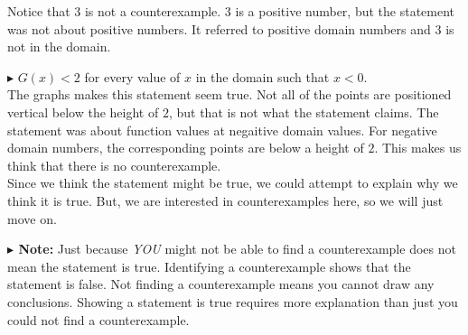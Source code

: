 \documentclass{ximera}
\begin{document}
Notice that $3$ is not a counterexample.  $3$ is a positive number, but the statement was not about positive numbers.  It referred to positive domain numbers and $3$ is not in the domain.














\textbf{\textcolor{red!90!darkgray}{$\blacktriangleright$}} $G(x) < 2$  for every value of $x$ in the domain such that $x < 0$. \\

The graphs makes this statement seem true.  Not all of the points are positioned vertical below the height of $2$, but that is not what the statement claims. The statement was about function values at negaitive domain values. For negative domain numbers, the corresponding points are below a height of $2$.  This makes us think that there is no counterexample.  \\

Since we think the statement might be true, we could attempt to explain why we think it is true.  But, we are interested in counterexamples here, so we will just move on.








\textbf{$\blacktriangleright$ Note:}  Just because \textit{YOU} might not be able to find a counterexample does not mean the statement is true.  Identifying a counterexample shows that the statement is false. Not finding a counterexample means you cannot draw any conclusions.  Showing a statement is true requires more explanation than just you could not find a counterexample. \\
\end{document}
